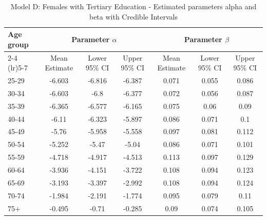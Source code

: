 \begin{landscape}
\begin{table}[htbp]
\centering
\caption{Model D: Females with Tertiary Education - Estimated parameters alpha and beta  with Credible Intervals}
\label{tab:parameters_ab28}
\begin{tabular}{@{}lcccccc@{}}
\toprule
Age group & \multicolumn{3}{c}{Parameter \(\alpha\)} & \multicolumn{3}{c}{Parameter \(\beta\)} \\ 
\cmidrule(lr){2-4} \cmidrule(lr){5-7}
          & Mean Estimate & Lower 95\% CI & Upper 95\% CI & Mean Estimate & Lower 95\% CI & Upper 95\% CI \\ 
\midrule
25-29 & -6.603 & -6.816 & -6.387 & 0.071 & 0.055 & 0.086 \\
30-34 & -6.603 & -6.8 & -6.377 & 0.072 & 0.056 & 0.087 \\
35-39 & -6.365 & -6.577 & -6.165 & 0.075 & 0.06 & 0.09 \\
40-44 & -6.11 & -6.323 & -5.897 & 0.086 & 0.071 & 0.1 \\
45-49 & -5.76 & -5.958 & -5.558 & 0.097 & 0.081 & 0.112 \\
50-54 & -5.252 & -5.47 & -5.04 & 0.086 & 0.071 & 0.101 \\
55-59 & -4.718 & -4.917 & -4.513 & 0.113 & 0.097 & 0.129 \\
60-64 & -3.936 & -4.151 & -3.722 & 0.108 & 0.094 & 0.123 \\
65-69 & -3.193 & -3.397 & -2.992 & 0.108 & 0.094 & 0.124 \\
70-74 & -1.984 & -2.191 & -1.774 & 0.095 & 0.079 & 0.11 \\
75+ & -0.495 & -0.71 & -0.285 & 0.09 & 0.074 & 0.105 \\
\bottomrule
\end{tabular}
\end{table}
\end{landscape}